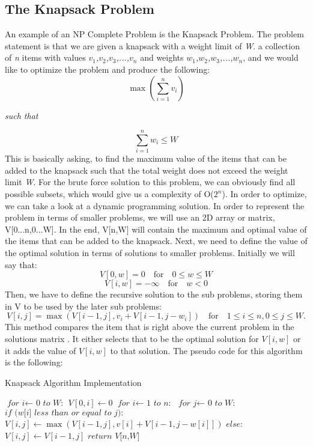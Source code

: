 \documentclass{article}
\begin{document}
    \subsection*{The Knapsack Problem} 
        An example of an NP Complete Problem is the Knapsack Problem. The problem statement is that we are given a knapsack with a weight limit of \textit{W}. a collection of \textit{n} items with values \textit{$v_1$,$v_2$,$v_3$,...,$v_n$} and weights \textit{$w_1$,$w_2$,$w_3$,...,$w_n$}, and we would like to optimize the problem and produce the following: $$\max({\sum_{i=1}^{n}v_i})$$ 
        \begin{center} \textit{such that} \end{center}
        $${\sum_{i=1}^{n}w_i} \leq W$$
        This is basically asking, to find the maximum value of the items that can be added to the knapsack such that the total weight does not exceed the weight limit \textit{W}. For the brute force solution to this problem, we can obviously find all possible subsets, which would give us a complexity of O($2^n$). In order to optimize, we can take a look at a dynamic programming solution. In order to represent the problem in terms of smaller problems, we will use an 2D array or matrix, V[0...n,0...W]. In the end, V[n,W] will contain the maximum and optimal value of the items that can be added to the knapsack. Next, we need to define the value of the optimal solution in terms of solutions to smaller problems. Initially we will say that: 
        $$V[0,w] = 0 \quad \textrm{for} \quad 0 \leq w \leq W $$
        $$V[i,w] = -\infty \quad \textrm{for} \quad w < 0 $$ 
        Then, we have to define the recursive solution to the sub problems, storing them in V to be used by the later sub problems: $$V[i,j] = \max(V[i-1,j],v_i+V[i-1,j-w_i]) \quad \textrm{for} \quad 1 \leq i \leq n,0 \leq j \leq W. $$
        This method compares the item that is right above the current problem in the solutions matrix . It either selects that to be the optimal solution for $V[i,w]$ or it adds the value of $V[i,w]$ to that solution. The pseudo code for this algorithm is the following: 
        \begin{algorithm}
        \caption{Knapsack Algorithm Implementation} 
        \begin{algorithmic}[1]
        \State $\textit{for i} \gets \textit{ 0 to W:}$ 
        \State \indent $V[0,i] \gets 0$
        \State $\textit{for i} \gets \textit{ 1 to n:}$
        \State \indent $\textit{for j} \gets \textit{ 0 to W:}$ 
        \State \indent \indent $\textit{if (w[i] less than or equal to j):}$ 
        \State \indent \indent \indent $V[i,j] \gets \max(V[i-1,j],v[i] + V[i-1,j-w[i]])$
        \State \indent \indent $\textit{else:}$
        \State \indent \indent \indent $V[i,j] \gets V[i-1,j]$
        \State $\textit{return V[n,W]}$
        \end{algorithmic}
        \end{algorithm}
     
\end{document}
